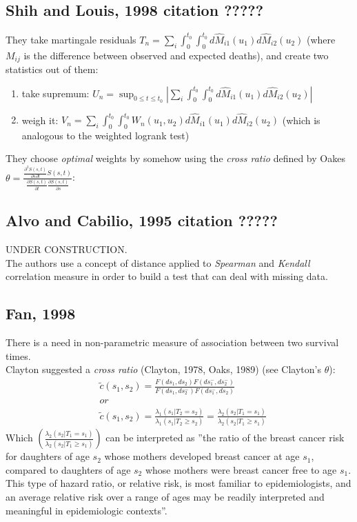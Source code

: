 \documentclass[]{article}
\begin{document}
\subsection{Shih and Louis, 1998 citation ?????}
They take martingale residuals $T_n=\sum_i \int_0^{t_0}  \int_0^{t_0} d\hat{M}_{i1}(u_1) d\hat{M}_{i2}(u_2)$ (where $M_{ij}$ is the difference between observed and expected deaths), and create two statistics out of them:
\begin{enumerate}
	\item take supremum: $U_n= \sup_{0\leq t \leq t_0} \left|\sum_i \int_0^{t_0}  \int_0^{t_0} d\hat{M}_{i1}(u_1) d\hat{M}_{i2}(u_2)\right|$
	\item weigh it: $V_n= \sum_i \int_0^{t_0}  \int_0^{t_0} W_n(u_1,u_2) d\hat{M}_{i1}(u_1) d\hat{M}_{i2}(u_2)$ (which is analogous to the weighted logrank test)
\end{enumerate}
They choose \emph{optimal} weights by somehow using the \emph{cross ratio} defined by Oakes $\theta = \frac{ \frac{\partial^2 S(s,t)}{\partial s \partial t} S(s, t)}    {\frac{\partial S(s, t)}{\partial t} \frac{\partial S(s, t)}{\partial s}}$: 

\subsection{Alvo and Cabilio, 1995 citation ?????}
UNDER CONSTRUCTION.\\
The authors use a concept of distance applied to \emph{Spearman} and \emph{Kendall} correlation measure in order to build a test that can deal with missing data. 



\subsection{Fan, 1998 \cite{fan2000dependence}}
There is a need in non-parametric measure of association between two survival times.\\
Clayton suggested a \textit{cross ratio} (Clayton, 1978, Oaks, 1989) (see Clayton's $\theta$):
	$$
	\begin{aligned}
		&\tilde{c}(s_1, s_2) = \frac{F(ds_1, ds_2)F(ds_1^-, ds_2^-)} {F(ds_1, ds_2^-)F(ds_1^-, ds_2)} \\
		 &or\\
		 & \tilde{c}(s_1, s_2) = \frac{ \lambda_1(s_1|T_2=s_2)}{\lambda_1(s_1|T_2 \geq s_2)} = \frac{ \lambda_2(s_2|T_1=s_1)}{\lambda_2(s_2|T_1 \geq s_1)}
	\end{aligned}
	$$
Which $\left(\frac{ \lambda_2(s_2|T_1=s_1)}{\lambda_2(s_2|T_1 \geq s_1)}\right)$ can be interpreted as ''the ratio of the breast cancer risk for daughters of age $s_2$ whose mothers developed breast cancer at age $s_1$, compared to daughters of age $s_2$ whose mothers were breast cancer free to age $s_1$. This type of hazard ratio, or relative risk, is most familiar to epidemiologists, and an average relative risk over a range of ages may be readily interpreted and meaningful in epidemiologic contexts''.\\
\end{document}
